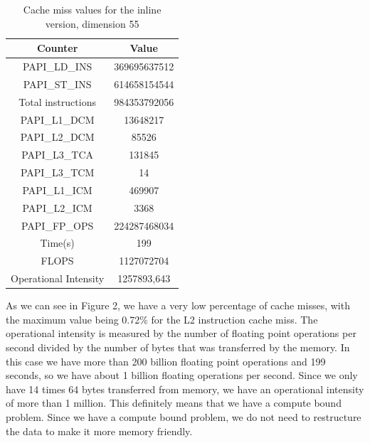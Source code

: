\documentclass[conference]{IEEEtran}
\begin{document}
\begin{table}[H]
\centering
\label{my-label}

\begin{tabular}{|c|c|}
\hline
\rowcolor[HTML]{C0C0c0} 
{\color[HTML]{000000} Counter} & {\color[HTML]{000000} Value}  \\ \hline
PAPI\_LD\_INS                     & 369695637512                 \\ \hline
PAPI\_ST\_INS                     & 614658154544                 \\ \hline
Total instructions                & 984353792056                 \\ \hline
PAPI\_L1\_DCM                     & 13648217                     \\ \hline
PAPI\_L2\_DCM                     & 85526                        \\ \hline
PAPI\_L3\_TCA                     & 131845                       \\ \hline
PAPI\_L3\_TCM                     & 14                           \\ \hline
PAPI\_L1\_ICM                     & 469907                       \\ \hline
PAPI\_L2\_ICM                     & 3368                         \\ \hline
PAPI\_FP\_OPS                     & 224287468034                 \\ \hline
Time(s)                           & 199                          \\ \hline
FLOPS                             & 1127072704                   \\ \hline
Operational Intensity             & 1257893,643                  \\ \hline
\end{tabular}
\caption{Cache miss values for the inline version, dimension 55}
\end{table}
    
As we can see in Figure 2, we have a very low percentage of cache misses, with the maximum value being 0.72\% for the L2 instruction cache miss. The operational intensity is measured by the number of floating point operations per second divided by the number of bytes that was transferred by the memory. In this case we have more than 200 billion floating point operations and 199 seconds, so we have about 1 billion floating operations per second. Since we only have 14 times 64 bytes transferred from memory, we have an operational intensity of more than 1 million. This definitely means that we have a compute bound problem. 
Since we have a compute bound problem, we do not need to restructure the data to make it more memory friendly.
\end{document}
